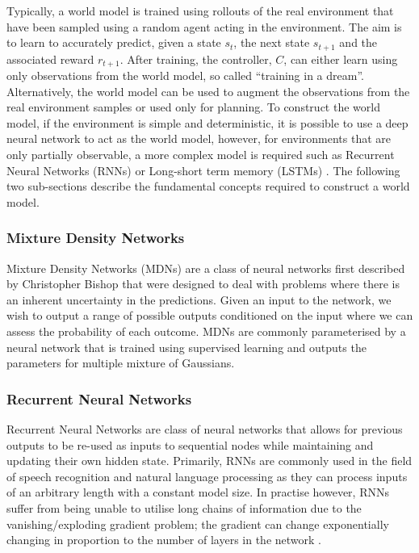 Typically, a world model is trained using rollouts of the real environment that have been sampled using a random agent acting in the environment. The aim is to learn to accurately predict, given a state $s_t$, the next state $s_{t+1}$ and the associated reward $r_{t+1}$. After training, the controller, $C$, can either learn using only observations from the world model, so called ``training in a dream''. Alternatively, the world model can be used to augment the observations from the real environment samples or used only for planning. To construct the world model, if the environment is simple and deterministic, it is possible to use a deep neural network to act as the world model, however, for environments that are only partially observable, a more complex model is required such as Recurrent Neural Networks (RNNs) \cite{650093, Hochreiter:01book} or Long-short term memory (LSTMs) \cite{hochreiter1997long, gers1999learning}. The following two sub-sections describe the fundamental concepts required to construct a world model.

\subsubsection{Mixture Density Networks}
Mixture Density Networks (MDNs) are a class of neural networks first described by Christopher Bishop \cite{bishop1994mixture} that were designed to deal with problems where there is an inherent uncertainty in the predictions. Given an input to the network, we wish to output a range of possible outputs conditioned on the input where we can assess the probability of each outcome. MDNs are commonly parameterised by a neural network that is trained using supervised learning and outputs the parameters for multiple mixture of Gaussians.

\subsubsection{Recurrent Neural Networks}
Recurrent Neural Networks are class of neural networks that allows for previous outputs to be re-used as inputs to sequential nodes while maintaining and updating their own hidden state. Primarily, RNNs are commonly used in the field of speech recognition and natural language processing as they can process inputs of an arbitrary length with a constant model size. In practise however, RNNs suffer from being unable to utilise long chains of information due to the vanishing/exploding gradient problem; the gradient can change exponentially changing in proportion to the number of layers in the network \cite{Hochreiter:01book}.

